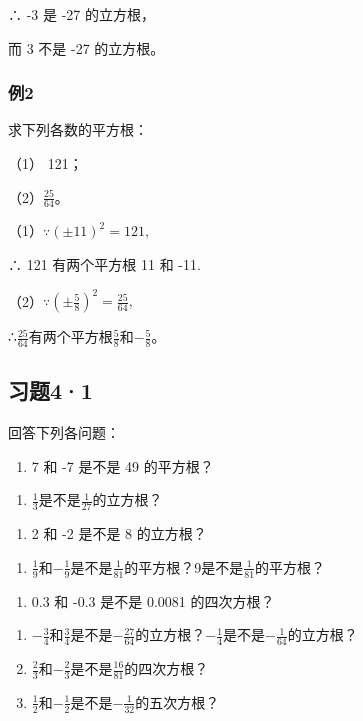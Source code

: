 ∴ -3 是 -27 的立方根，

而 3 不是 -27 的立方根。

\subsubsection{例2}

求下列各数的平方根：

（1） 121；

（2）\(\frac{25}{64}\)。


（1）\(\because (\pm 11)^{2} = 121,\)

∴ 121 有两个平方根 11 和 -11.

（2）\(\because \left(\pm \frac{5}{8}\right)^2 = \frac{25}{64},\)

∴\(\frac{25}{64}\)有两个平方根\(\frac{5}{8}\)和\(-\frac{5}{8}\)。

\subsection{习题4·1}

回答下列各问题：

\begin{enumerate}
\item
  7 和 -7 是不是 49 的平方根？
\end{enumerate}

\begin{enumerate}[start=2]
\item
  \(\frac{1}{3}\)是不是\(\frac{1}{27}\)的立方根？
\end{enumerate}

\begin{enumerate}[start=3]
\item
  2 和 -2 是不是 8 的立方根？
\end{enumerate}

\begin{enumerate}[start=4]
\item
  \(\frac{1}{9}\)和\(-\frac{1}{9}\)是不是\(\frac{1}{81}\)的平方根？9是不是\(\frac{1}{81}\)的平方根？
\end{enumerate}

\begin{enumerate}[start=5]
\item
  0.3 和 -0.3 是不是 0.0081 的四次方根？
\end{enumerate}

\begin{enumerate}[start=6]
\item
  \(-\frac{3}{4}\)和\(\frac{3}{4}\)是不是\(-\frac{27}{64}\)的立方根？\(-\frac{1}{4}\)是不是\(-\frac{1}{64}\)的立方根？
\item
  \(\frac{2}{3}\)和\(-\frac{2}{3}\)是不是\(\frac{16}{81}\)的四次方根？
\item
  \(\frac{1}{2}\)和\(-\frac{1}{2}\)是不是\(-\frac{1}{32}\)的五次方根？
\end{enumerate}

